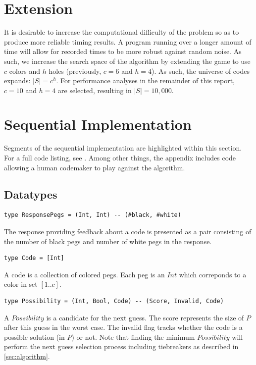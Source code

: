 \documentclass{article}
\begin{document}
\section{Extension}
It is desirable to increase the computational difficulty of the problem so as to produce more reliable timing results. A program running over a longer amount of time will allow for recorded times to be more robust against random noise. As such, we increase the search space of the algorithm by extending the game to use $c$ colors and $h$ holes (previously, $c=6$ and $h=4$). As such, the universe of codes expands: $|S| = c^h$. For performance analyses in the remainder of this report, $c=10$ and $h=4$ are selected, resulting in $|S| = 10,000$.

\section{Sequential Implementation}
Segments of the sequential implementation are highlighted within this section. For a full code listing, see . Among other things, the appendix includes code allowing a human codemaker to play against the algorithm. 

\subsection{Datatypes}
\begin{verbatim}
type ResponsePegs = (Int, Int) -- (#black, #white)
\end{verbatim}
The response providing feedback about a code is presented as a pair consisting of the number of black pegs and number of white pegs in the response.

\begin{verbatim}
type Code = [Int]
\end{verbatim}
A code is a collection of colored pegs. Each peg is an $Int$ which correponds to a color in set $[1..c]$.

\begin{verbatim}
type Possibility = (Int, Bool, Code) -- (Score, Invalid, Code)
\end{verbatim}
A $Possibility$ is a candidate for the next guess. The score represents the size of $P$ after this guess in the worst case. The invalid flag tracks whether the code is a possible solution (in $P$) or not. Note that finding the minimum $Possibility$ will perform the next guess selection process including tiebreakers as described in \autoref{sec:algorithm}.
\end{document}
